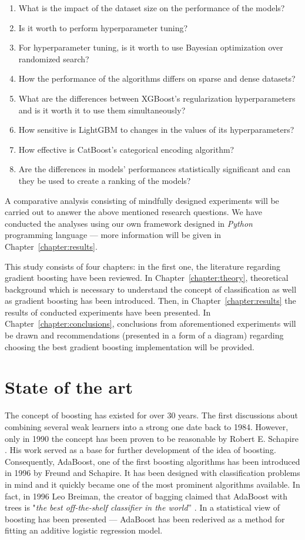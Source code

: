 \documentclass[magisterska, english]{pwr_wmat_praca_dyplomowa}
\theoremstyle{plain}
\numberwithin{theorem}{chapter}
\theoremstyle{definition}
\numberwithin{theorem}{chapter}
\begin{document}
\begin{enumerate}
    \item What is the impact of the dataset size on the performance of the models?
    \item Is it worth to perform hyperparameter tuning?
    \item For hyperparameter tuning, is it worth to use Bayesian optimization over randomized search?
    \item How the performance of the algorithms differs on sparse and dense datasets?
    \item What are the differences between XGBoost's regularization hyperparameters and is it worth it to use them simultaneously?
    \item How sensitive is LightGBM to changes in the values of its hyperparameters?
    \item How effective is CatBoost's categorical encoding algorithm?
    \item Are the differences in models' performances statistically significant and can they be used to create a ranking of the models?
\end{enumerate}

A comparative analysis consisting of mindfully designed experiments will be carried out to answer the above mentioned research questions. We have conducted the analyses using our own framework designed in \emph{Python} programming language --- more information will be given in Chapter~\ref{chapter:results}.

This study consists of four chapters: in the first one, the literature regarding gradient boosting have been reviewed. In Chapter~\ref{chapter:theory}, theoretical background which is necessary to understand the concept of classification as well as gradient boosting has been introduced. Then, in Chapter~\ref{chapter:results} the results of conducted experiments have been presented.
In Chapter~\ref{chapter:conclusions}, conclusions from aforementioned experiments will be drawn and recommendations (presented in a form of a diagram) regarding choosing the best gradient boosting implementation will be provided.

\section{State of the art}
The concept of boosting has existed for over 30 years. The first discussions about combining several weak learners into a strong one date back to 1984. However, only in 1990 the concept has been proven to be reasonable by Robert E. Schapire \cite{schapire1990}. His work served as a base for further development of the idea of boosting. Consequently, AdaBoost, one of the first boosting algorithms has been introduced in 1996 by Freund and Schapire. It has been designed with classification problems in mind and it quickly became one of the most prominent algorithms available. In fact, in 1996 Leo Breiman, the creator of bagging claimed that AdaBoost with trees is "\emph{the best off-the-shelf classifier in the world}” \cite{esl}. In \cite{add_log} a statistical view of boosting has been presented --- AdaBoost has been rederived as a method for
fitting an additive logistic regression model.
\end{document}
